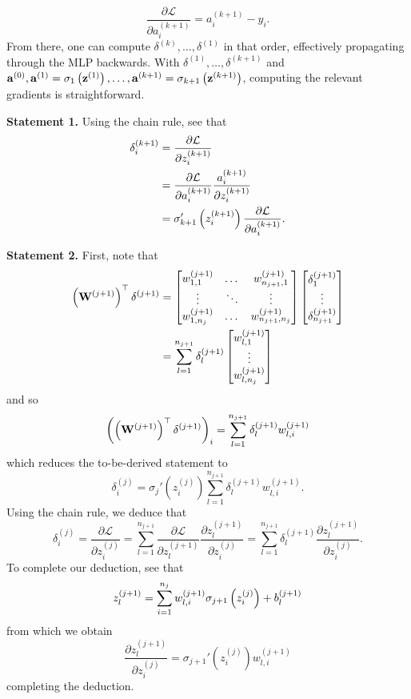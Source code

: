 \documentclass[11pt]{article}
\begin{document}
$$
\frac{\partial\mathcal{L}}{\partial a_i^{(k+1)}}
=
a_i^{(k+1)}-y_i.
$$
From there, one can compute $\delta^{(k)},\dots,\delta^{(1)}$ in that order, effectively propagating through the MLP backwards. With $\delta^{(1)},\dots,\delta^{(k+1)}$ and $\mathbf{a}^{(0)},\mathbf{a}^{(1)}=\sigma_1\left(\mathbf{z}^{(1)}\right),\dots,\mathbf{a}^{(k+1)}=\sigma_{k+1}\left(\mathbf{z}^{(k+1)}\right)$, computing the relevant gradients is straightforward.

\vspace{10pt}
\noindent\textbf{Statement 1.} Using the chain rule, see that
\begin{align*}
    \delta_i^{(k+1)}
    &=
    \frac{\partial\mathcal{L}}{\partial z_i^{(k+1)}}\\
    &=
    \frac{\partial\mathcal{L}}{\partial a_i^{(k+1)}}\frac{a_i^{(k+1)}}{\partial z_i^{(k+1)}}\\
    &=
    \sigma_{k+1}'\left(z_i^{(k+1)}\right)\frac{\partial\mathcal{L}}{\partial a_i^{(k+1)}}.
\end{align*}

\noindent\textbf{Statement 2.} First, note that
\begin{align*}
    \left(\mathbf{W}^{(j+1)}\right)^\top\delta^{(j+1)}
    &=
    \begin{bmatrix}
        w_{1,1}^{(j+1)}   & \dots  & w_{n_{j+1},1}^{(j+1)}\\
        \vdots            & \ddots & \vdots               \\
        w_{1,n_j}^{(j+1)} & \dots  & w_{n_{j+1},n_j}^{(j+1)}
    \end{bmatrix}
    \begin{bmatrix}
        \delta_1^{(j+1)}\\
        \vdots\\
        \delta_{n_{j+1}}^{(j+1)}
    \end{bmatrix}\\
    &=
    \sum_{l=1}^{n_{j+1}}\delta_l^{(j+1)}
    \begin{bmatrix}
        w_{l,1}^{(j+1)}\\
        \vdots\\
        w_{l,n_j}^{(j+1)}
    \end{bmatrix}
\end{align*}
and so
$$
\left(\left(\mathbf{W}^{(j+1)}\right)^\top\delta^{(j+1)}\right)_i
=
\sum_{l=1}^{n_{j+1}}\delta_l^{(j+1)}w_{l,i}^{(j+1)}
$$
which reduces the to-be-derived statement to
$$
\delta_i^{(j)}
=
\sigma_j'(z_i^{(j)})\sum_{l=1}^{n_{j+1}}\delta_l^{(j+1)}w_{l,i}^{(j+1)}.
$$
Using the chain rule, we deduce that
\begin{equation*}
    \label{eq:back_prop_statement_2}
    \delta_i^{(j)}
    =
    \frac{\partial\mathcal{L}}{\partial z_i^{(j)}}
    =
    \sum_{l=1}^{n_{j+1}}\frac{\partial\mathcal{L}}{\partial z_l^{(j+1)}}\frac{\partial z_l^{(j+1)}}{\partial z_i^{(j)}}
    =
    \sum_{l=1}^{n_{j+1}}\delta_l^{(j+1)}\frac{\partial z_l^{(j+1)}}{\partial z_i^{(j)}}.
\end{equation*}
To complete our deduction, see that
$$
z_l^{(j+1)}
=
\sum_{i=1}^{n_j}w_{l,i}^{(j+1)}\sigma_{j+1}\left(z_i^{(j)}\right)+b_l^{(j+1)}
$$
from which we obtain
$$
\frac{\partial z_l^{(j+1)}}{\partial z_i^{(j)}}
=
\sigma_{j+1}'(z_i^{(j)})w_{l,i}^{(j+1)}
$$
completing the deduction.
\end{document}
